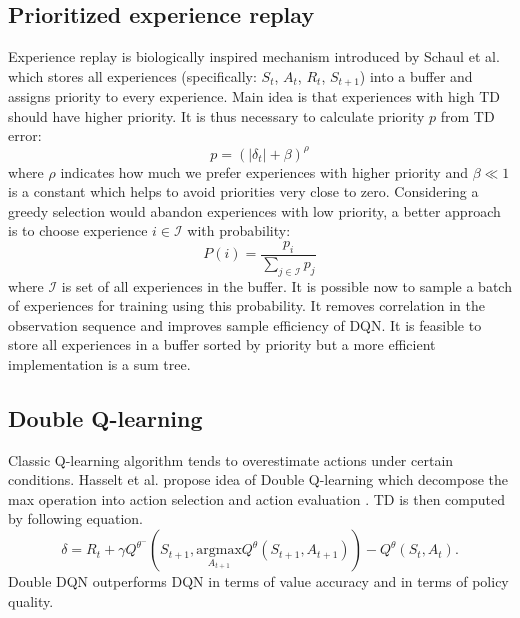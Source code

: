 \subsection{Prioritized experience replay}
Experience replay is biologically inspired mechanism introduced by Schaul et al. \cite{schaul2015} which stores all experiences (specifically: $S_t$, $A_t$, $R_{t}$, $S_{t+1}$) into a buffer and assigns priority to every experience. Main idea is that experiences with high TD should have higher priority. It is thus necessary to calculate priority $p$ from TD error:
\begin{equation}
p = (|\delta_t | + \beta)^\rho
\end{equation}
where $\rho$ indicates how much we prefer experiences with higher priority and $\beta \ll 1$ is a constant which helps to avoid priorities very close to zero. Considering a greedy selection would abandon experiences with low priority, a better approach is to choose experience $i \in \mathcal{I}$ with probability:
\begin{equation}
P(i) = \frac{p_i}{\sum_{j \in \mathcal{I}} p_j}
\end{equation}
where $\mathcal{I}$ is set of all experiences in the buffer. It is possible now to sample a batch of experiences for training using this probability. It removes correlation in the observation sequence and improves sample efficiency of DQN. It is feasible to store all experiences in a buffer sorted by priority but a more efficient implementation is a sum tree.

\subsection{Double Q-learning}
Classic Q-learning algorithm tends to overestimate actions under certain conditions. Hasselt et al. propose idea of Double Q-learning which decompose the max operation into action selection and action evaluation \cite{hasselt2015}. TD is then computed by following equation.
\begin{equation}
\delta = R_{t} + \gamma Q^{\theta^-}(S_{t+1}, \underset{A_{t+1}}{\text{argmax}}Q^\theta(S_{t+1}, A_{t+1})) - Q^\theta (S_t, A_t).
\end{equation}
Double DQN outperforms DQN in terms of value accuracy and in terms of policy quality.

\clearpage
